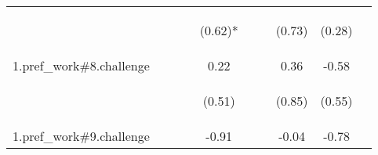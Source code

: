 \begin{center}
\begin{tabular}{lccccccccc}
 & \begin{footnotesize}\end{footnotesize} & \begin{footnotesize}\end{footnotesize} & \begin{footnotesize}\end{footnotesize} & \begin{footnotesize}(0.62)*\end{footnotesize} & \begin{footnotesize}\end{footnotesize} & \begin{footnotesize}\end{footnotesize} & \begin{footnotesize}(0.73)\end{footnotesize} & \begin{footnotesize}(0.28)\end{footnotesize} & \begin{footnotesize}\end{footnotesize}\\
\noalign{\smallskip}1.pref_work\#8.challenge &  &  &  & 0.22 &  &  & 0.36 & -0.58 & \\
 & \begin{footnotesize}\end{footnotesize} & \begin{footnotesize}\end{footnotesize} & \begin{footnotesize}\end{footnotesize} & \begin{footnotesize}(0.51)\end{footnotesize} & \begin{footnotesize}\end{footnotesize} & \begin{footnotesize}\end{footnotesize} & \begin{footnotesize}(0.85)\end{footnotesize} & \begin{footnotesize}(0.55)\end{footnotesize} & \begin{footnotesize}\end{footnotesize}\\
\noalign{\smallskip}1.pref_work\#9.challenge &  &  &  & -0.91 &  &  & -0.04 & -0.78 & \\

\end{tabular}
\end{center}
